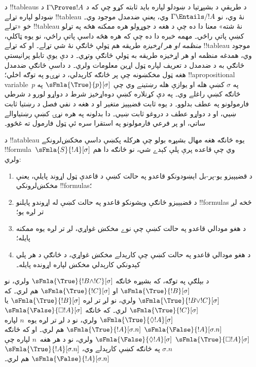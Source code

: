 \documentclass[../../../include/open-logic-section]{subfiles}
\begin{document}


\begin{explain}
  د !!{tableau}s د طريقې د بشپړتيا د ښودلو لپاره بايد ثابته کړو
  چې که د $\Gamma \Proves !A$ د ښودلو لپاره تړلے !!{tableau}
  نۀ وي، نو $\Gamma \Entails/ !A$ وي، يعنې ضدمدل موجود وي۔
  خو «تړلے !!{tableau} نۀ شته» معنا دا ده چې د هغه د جوړولو
  هره ممکنه هڅه په تړلو کښې پاتې راځي۔ مهمه خبره دا ده چې که
  هره هڅه داسې پاتې راځي، نو يوه ټاکلې، \emph{منظمه او هر اړخيزه}
  طريقه هم ټولې څانګې نۀ شي تړلے۔ او که تړلے !!{tableau} موجود وي،
  همدغه منظمه او هر اړخيزه طريقه به ټولې څانګې وتړي۔ د دې يوې تابلو
  پرانيستې څانګې به د ضدمدل د تعريف لپاره ټول اړين معلومات ولري۔
  د داسې څانګې ضدمدل هغه ټول مخکښونه چې پر څانګه کارېدلي،
  د نړۍو په توګه اخلي؛ !!a{propositional
    variable}~$p$ په
  $\sigma$ کښې هله او يوازې هله رښتينے وي چې
  $\sFmla{\True}{p}[\sigma]$ په څانګه کښې راغلے وي۔
  په دې کړنلاره کښې دوه‌اړخيز شرط د دواړو لورو د شرطي فارمولونو
  په عطف بدلوو۔ د يوه ثابت قضيېيز متغير او د هغه د نفي فصل د
  رښتيا ثابت ښيي، او د دواړو عطف د دروغو ثابت ښيي۔ دا بدلونه
  په هره نړۍ کښې رښتياوالے ساتي، او پر فرعي فارمولونو په
  استقرا سره ئې ټول فارمول ته غځوو۔
\end{explain}

\begin{defn}
  د !!a{tableau} يوه څانګه هغه مهال بشپړه بولو چې هرکله پکښې
  داسې مخکښ‌لرونکے !!{formula}~$\sFmla{S}{!A}[\sigma]$ وي چې
  قاعده پرې پلې کېدے شي، نو څانګه دا هم ولري:
  \begin{enumerate}
    \item د قضيېيزو يو-پر-بل اېښودونکو قاعدو په حالت کښې د
      قاعدې ټول اړوند پايلې، يعنې مخکښ‌لرونکي !!{formula}s؛
    \item د قضيېيزو څانګې وېشونکو قاعدو په حالت کښې له
      اړوندو پايلنو !!{formula}s څخه لږ تر لږه يو؛
    \item د هغو مودالي قاعدو په حالت کښې چې نوے مخکښ غواړي،
      لږ تر لږه يوه ممکنه پايله؛
    \item د هغو مودالي قاعدو په حالت کښې چې کارېدلے مخکښ
      غواړي، د څانګې د هر پلي کېدونکي کارېدلي مخکښ لپاره
      اړونده پايله۔
  \end{enumerate}
\end{defn}

\begin{explain}
د بېلګې په توګه، که بشپړه څانګه $\sFmla{\True}{!B
  \land !C}[\sigma]$ ولري، نو $\sFmla{\True}{!B}[\sigma]$
او $\sFmla{\True}{!C}[\sigma]$ هم لري۔ که
$\sFmla{\True}{!B \lor !C}[\sigma]$ ولري، نو لږ تر لږه
$\sFmla{\True}{!B}[\sigma]$ يا $\sFmla{\True}{!C}[\sigma]$
لري۔
که څانګه 
{$\sFmla{\False}{\Box !A}[\sigma]$} {$\sFmla{\True}{\Diamond !A}[\sigma]$}
ولري، نو د لږ تر لږه يوه~$n$ لپاره
 {$\sFmla{\False}{!A}[\sigma.n]$}
{$\sFmla{\True}{!A}[\sigma.n]$} هم لري۔ او که څانګه
 {$\sFmla{\True}{\Box !A}[\sigma]$}
{$\sFmla{\False}{\Diamond !A}[\sigma]$} ولري، نو د هر هغه~$n$
لپاره چې $\sigma.n$ په څانګه کښې کارېدلے وي،
 {$\sFmla{\True}{!A}[\sigma.n]$}
{$\sFmla{\False}{!A}[\sigma.n]$} هم لري۔
\end{explain}
\end{document}
